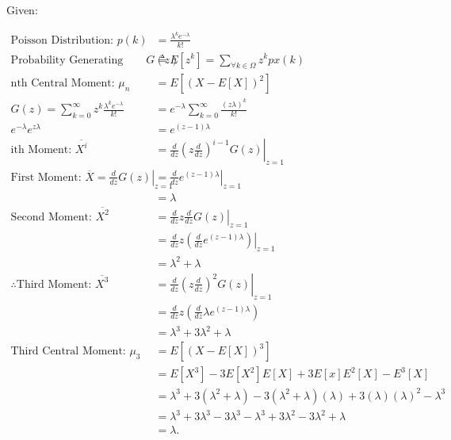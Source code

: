 Given:

\begin{align*}
	\text{Poisson Distribution: } p(k) &= \frac{\lambda^ke^{-\lambda}}{k!}\\
	\text{Probability Generating Function: } G(z) &\triangleq E[z^k] =
	\sum_{\forall k \in \Omega} z^kpx(k) \\
	\text{nth Central Moment: } \mu_n &= E[(X-E[X])^2] \\
	G(z) = \sum_{k=0}^{\infty} z^k\frac{\lambda^ke^{-\lambda}}{k!} &=
	e^{-\lambda}\sum_{k=0}^{\infty} \frac{(z\lambda)^k}{k!}\\
	e^{-\lambda}e^{z\lambda} &= e^{(z-1)\lambda}\\
	\text{ith Moment: } \overline{X^i} &=
	\left.\frac{d}{dz}(z\frac{d}{dz})^{i-1}G(z)\right|_{z=1}\\
	\text{First Moment: } \overline{X} = \left.\frac{d}{dz}
	G(z)\right|_{z=1} &= \left.\frac{d}{dz} e^{(z-1)\lambda}\right|_{z=1}\\
	&= \lambda\\
	\text{Second Moment: } \overline{X^2} &=
	\left.\frac{d}{dz}z\frac{d}{dz}G(z)\right|_{z=1}\\
	&= \left.\frac{d}{dz}z(\frac{d}{dz}e^{(z-1)\lambda})\right|_{z=1}\\
	&= \lambda^2 + \lambda\\
	\therefore \text{Third Moment: } \overline{X^3} &=
	\left.\frac{d}{dz}(z\frac{d}{dz})^2G(z)\right|_{z=1}\\
	&= \left.\frac{d}{dz}z(\frac{d}{dz}\lambda e^{(z-1)\lambda})\\
	&= \lambda^3 + 3\lambda^2 + \lambda\\
	\text{Third Central Moment: } \mu_3 &= E[(X-E[X])^3]\\
	&= E[X^3]-3E[X^2]E[X]+3E[x]E^2[X]-E^3[X]\\
	&= \lambda^3+3(\lambda^2+\lambda) -3(\lambda^2+\lambda)(\lambda)
	+3(\lambda)(\lambda)^2 - \lambda^3\\
	&= \lambda^3 +3\lambda^3 - 3\lambda^3 -\lambda^3 + 3\lambda^2 -
	3\lambda^2 + \lambda\\
	&= \lambda
.\end{align*}
